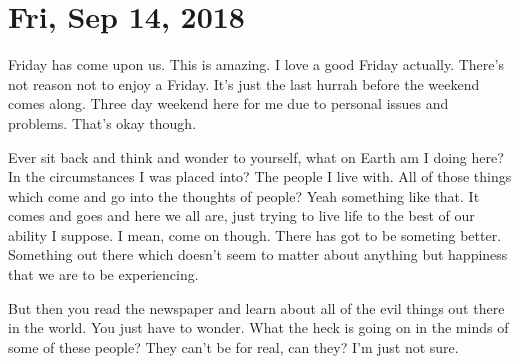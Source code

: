 \section{Fri, Sep 14, 2018}

Friday has come upon us. This is amazing. I love a good Friday actually. There's not
reason not to enjoy a Friday. It's just the last hurrah before the weekend comes
along. Three day weekend here for me due to personal issues and problems. That's okay
though.

Ever sit back and think and wonder to yourself, what on Earth am I doing here? In the
circumstances I was placed into? The people I live with. All of those things which
come and go into the thoughts of people? Yeah something like that. It comes and goes
and here we all are, just trying to live life to the best of our ability I suppose. I
mean, come on though. There has got to be someting better. Something out there which
doesn't seem to matter about anything but happiness that we are to be experiencing.

But then you read the newspaper and learn about all of the evil things out there in
the world. You just have to wonder. What the heck is going on in the minds of some of
these people? They can't be for real, can they? I'm just not sure.